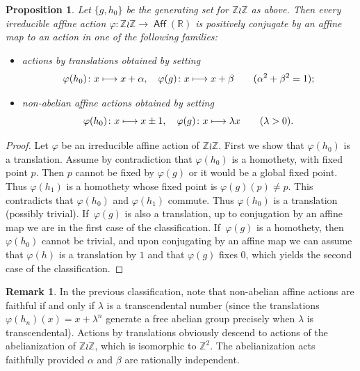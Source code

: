 \documentclass[JEP,XML,SOM,Unicode,NoFloatCountersInSection,published]{cedram}
\def\mto{\mathchoice{\longmapsto}{\mapsto}{\mapsto}{\mapsto}}
\newtheorem{prop}[thm]{Proposition}
\theoremstyle{definition}
\newtheorem{rem}[thm]{Remark}
\DeclareMathOperator{\Aff}{\mathsf{Aff}}
\newcommand{\R}{\mathbb{R}}
\newcommand{\Z}{\mathbb Z}
\begin{document}
\begin{prop} \label{l-wr-affine} Let $\{g,h_0\}$ be the generating set for $\Z\wr\Z$ as above. Then every irreducible affine action $\varphi\colon \Z \wr \Z\to \Aff(\R)$ is positively conjugate by an affine map to an action in one of the following families:
\begin{itemize}
\item actions by translations obtained by setting
\[\varphi(h_0)\colon x\mto x+\alpha, \quad \varphi(g)\colon x\mto x +\beta \quad \quad (\alpha^2+\beta^2=1);
\]
\item non-abelian affine actions obtained by setting
\[\varphi(h_0)\colon x\mto x\pm 1, \quad \varphi(g) \colon x\mto \lambda x\quad \quad (\lambda>0).
\]
\end{itemize}
\end{prop}
\begin{proof}
Let $\varphi$ be an irreducible affine action of $\Z\wr\Z$. First we show that $\varphi(h_0)$ is a translation. Assume by contradiction that $\varphi(h_0)$ is a homothety, with fixed point $p$. Then $p$ cannot be fixed by $\varphi(g)$ or it would be a global fixed point. Thus $\varphi(h_1)$ is a homothety whose fixed point is $\varphi(g)(p)\neq p$. This contradicts that $\varphi(h_0)$ and $\varphi(h_1)$ commute. Thus $\varphi(h_0)$ is a translation (possibly trivial). If~$\varphi(g)$ is also a translation, up to conjugation by an affine map we are in the first case of the classification. If~$\varphi(g)$ is a homothety, then $\varphi(h_0)$ cannot be trivial, and upon conjugating by an affine map we can assume that $\varphi(h)$ is a translation by $1$ and that $\varphi(g)$ fixes 0, which yields the second case of the classification.
\end{proof}

\begin{rem}
In the previous classification, note that non-abelian affine actions are faithful if and only if $\lambda$ is a transcendental number (since the translations $\varphi(h_n)(x)=x+\lambda^n$ generate a free abelian group precisely when $\lambda $ is transcendental). Actions by translations obviously descend to actions of the abelianization of $\Z \wr \Z$, which is isomorphic to $\Z^2$. The abelianization acts faithfully provided $\alpha$ and $\beta$ are rationally independent.
\end{rem}
\end{document}
